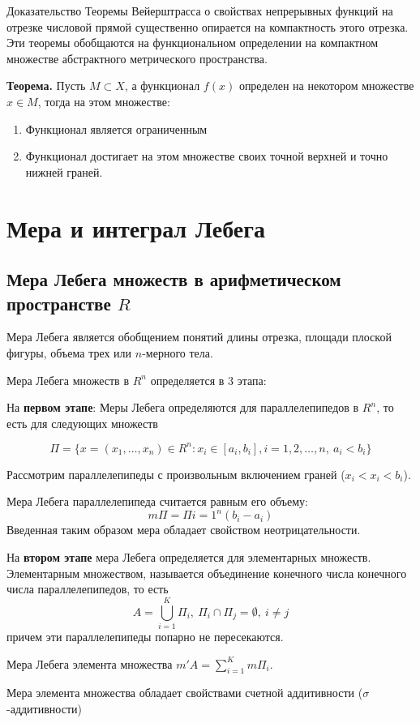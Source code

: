 \documentclass[14pt,a4paper]{extarticle}
\theoremstyle{definition}
\theoremstyle{remark}
\renewcommand{\[}{\begin{dmath*}[compact]}
\renewcommand{\]}{\end{dmath*}}
\newcommand{\be}{\begin{enumerate}}
\newcommand{\ee}{\end{enumerate}}
\newcommand{\sep}{ , \ \allowbreak }
\newcommand{\tth}[1][]{\textbf{Теорема#1.}}
\begin{document}
Доказательство Теоремы Вейерштрасса о свойствах непрерывных функций на отрезке числовой прямой существенно опирается на компактность этого отрезка. Эти теоремы обобщаются на функциональном определении на компактном множестве абстрактного метрического пространства.

\tth[] Пусть $M\subset X$, а функционал $f(x)$ определен на некотором множестве $x \in M$, тогда на этом множестве:

\be
  \item Функционал является ограниченным
  \item Функционал достигает на этом множестве своих точной верхней и точно нижней граней.
\ee

\section{Мера и интеграл Лебега}

\subsection{Мера Лебега множеств в арифметическом пространстве \texorpdfstring{$R$}{Lg}}

Мера Лебега является обобщением понятий длины отрезка, площади плоской фигуры, объема трех или $n$-мерного тела.

Мера Лебега множеств в $R^n$ определяется в 3 этапа:

На \textbf{первом этапе}: Меры Лебега определяются для параллелепипедов в $R^n$, то есть для следующих множеств

\[
  \Pi = \{x=(x_1,\dots,x_n)\in R^n: x_i\in [a_i,b_i], i=1,2,\dots,n\sep a_i<b_i\}
\]

Рассмотрим параллелепипеды с произвольным включением граней ($x_i<x_i<b_i$).

Мера Лебега параллелепипеда считается равным его объему:
\[m\Pi = \Pi{i=1}^n(b_i-a_i)\]
Введенная таким образом мера обладает свойством неотрицательности.

На \textbf{втором этапе} мера Лебега определяется для элементарных множеств. Элементарным множеством, называется объединение конечного числа конечного числа параллелепипедов, то есть
\[A=\bigcup _{i=1}^K \Pi_i\sep\Pi_i \cap \Pi_j = \emptyset \sep i\neq j\]
причем эти параллелепипеды попарно не пересекаются.

Мера Лебега элемента множества $m'A=\sum_{i=1}^Km\Pi_i$.

Мера элемента множества обладает свойствами счетной аддитивности ($\sigma$-аддитивности)
\end{document}
